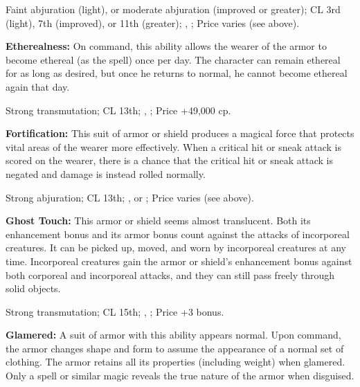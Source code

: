 Faint abjuration (light), or moderate abjuration (improved or greater); CL 3rd (light), 7th (improved), or 11th (greater); , ; Price varies (see above).

\textbf{Etherealness:} On command, this ability allows the wearer of the armor to become ethereal (as the  spell) once per day. The character can remain ethereal for as long as desired, but once he returns to normal, he cannot become ethereal again that day.

Strong transmutation; CL 13th; , ; Price +49,000 cp. 

\textbf{Fortification:} This suit of armor or shield produces a magical force that protects vital areas of the wearer more effectively. When a critical hit or sneak attack is scored on the wearer, there is a chance that the critical hit or sneak attack is negated and damage is instead rolled normally.


Strong abjuration; CL 13th; ,  or ; Price varies (see above).

\textbf{Ghost Touch:} This armor or shield seems almost translucent. Both its enhancement bonus and its armor bonus count against the attacks of incorporeal creatures. It can be picked up, moved, and worn by incorporeal creatures at any time. Incorporeal creatures gain the armor or shield's enhancement bonus against both corporeal and incorporeal attacks, and they can still pass freely through solid objects.

Strong transmutation; CL 15th; , ; Price +3 bonus.

\textbf{Glamered:} A suit of armor with this ability appears normal. Upon command, the armor changes shape and form to assume the appearance of a normal set of clothing. The armor retains all its properties (including weight) when glamered. Only a  spell or similar magic reveals the true nature of the armor when disguised.

